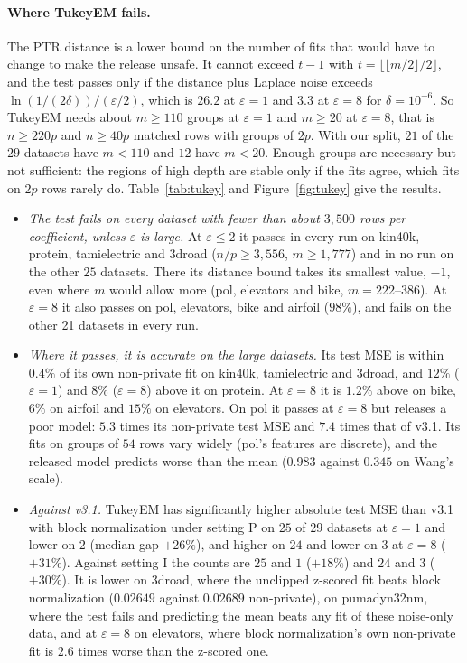 \documentclass[11pt]{article}
\theoremstyle{definition}
\theoremstyle{plain}
\begin{document}
\paragraph{Where TukeyEM fails.} The PTR distance is a lower bound on the number of fits that would have to change to make the release unsafe. It cannot exceed $t - 1$ with $t = \lfloor\lfloor m/2\rfloor/2\rfloor$, and the test passes only if the distance plus Laplace noise exceeds $\ln(1/(2\delta))/(\varepsilon/2)$, which is $26.2$ at $\varepsilon = 1$ and $3.3$ at $\varepsilon = 8$ for $\delta = 10^{-6}$. So TukeyEM needs about $m \ge 110$ groups at $\varepsilon = 1$ and $m \ge 20$ at $\varepsilon = 8$, that is $n \ge 220p$ and $n \ge 40p$ matched rows with groups of $2p$. With our split, $21$ of the $29$ datasets have $m < 110$ and $12$ have $m < 20$. Enough groups are necessary but not sufficient: the regions of high depth are stable only if the fits agree, which fits on $2p$ rows rarely do. Table~\ref{tab:tukey} and Figure~\ref{fig:tukey} give the results.
\begin{itemize}
  \item \emph{The test fails on every dataset with fewer than about $3{,}500$ rows per coefficient, unless $\varepsilon$ is large.} At $\varepsilon \le 2$ it passes in every run on kin40k, protein, tamielectric and 3droad ($n/p \ge 3{,}556$, $m \ge 1{,}777$) and in no run on the other $25$ datasets. There its distance bound takes its smallest value, $-1$, even where $m$ would allow more (pol, elevators and bike, $m = 222$--$386$). At $\varepsilon = 8$ it also passes on pol, elevators, bike and airfoil ($98\%$), and fails on the other 21 datasets in every run.
  \item \emph{Where it passes, it is accurate on the large datasets.} Its test MSE is within $0.4\%$ of its own non-private fit on kin40k, tamielectric and 3droad, and $12\%$ ($\varepsilon = 1$) and $8\%$ ($\varepsilon = 8$) above it on protein. At $\varepsilon = 8$ it is $1.2\%$ above on bike, $6\%$ on airfoil and $15\%$ on elevators. On pol it passes at $\varepsilon = 8$ but releases a poor model: $5.3$ times its non-private test MSE and $7.4$ times that of v3.1. Its fits on groups of $54$ rows vary widely (pol's features are discrete), and the released model predicts worse than the mean ($0.983$ against $0.345$ on Wang's scale).
  \item \emph{Against v3.1.} TukeyEM has significantly higher absolute test MSE than v3.1 with block normalization under setting P on $25$ of $29$ datasets at $\varepsilon = 1$ and lower on $2$ (median gap $+26\%$), and higher on $24$ and lower on $3$ at $\varepsilon = 8$ ($+31\%$). Against setting I the counts are $25$ and $1$ ($+18\%$) and $24$ and $3$ ($+30\%$). It is lower on 3droad, where the unclipped z-scored fit beats block normalization ($0.02649$ against $0.02689$ non-private), on pumadyn32nm, where the test fails and predicting the mean beats any fit of these noise-only data, and at $\varepsilon = 8$ on elevators, where block normalization's own non-private fit is $2.6$ times worse than the z-scored one.
\end{itemize}
\end{document}
